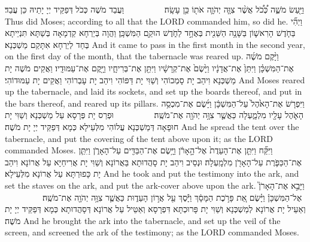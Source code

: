 {%
{וַיַּ֖עַשׂ מֹשֶׁ֑ה כְּ֠כֹ֠ל אֲשֶׁ֨ר צִוָּ֧ה יְהֹוָ֛ה אֹת֖וֹ כֵּ֥ן עָשָֽׂה׃ \setuma         }
{וַעֲבַד מֹשֶׁה כְּכֹל דְּפַקֵּיד יְיָ יָתֵיהּ כֵּן עֲבַד׃}
{Thus did Moses; according to all that the LORD commanded him, so did he.}{}
{וַיְהִ֞י בַּחֹ֧דֶשׁ הָרִאשׁ֛וֹן בַּשָּׁנָ֥ה הַשֵּׁנִ֖ית בְּאֶחָ֣ד לַחֹ֑דֶשׁ הוּקַ֖ם הַמִּשְׁכָּֽן׃}
{וַהֲוָה בְּיַרְחָא קַדְמָאָה בְּשַׁתָּא תִּנְיֵיתָא בְּחַד לְיַרְחָא אִתָּקַם מַשְׁכְּנָא׃}
{And it came to pass in the first month in the second year, on the first day of the month, that the tabernacle was reared up.}{}
{וַיָּ֨קֶם מֹשֶׁ֜ה אֶת־הַמִּשְׁכָּ֗ן וַיִּתֵּן֙ אֶת־אֲדָנָ֔יו וַיָּ֙שֶׂם֙ אֶת־קְרָשָׁ֔יו וַיִּתֵּ֖ן אֶת־בְּרִיחָ֑יו וַיָּ֖קֶם אֶת־עַמּוּדָֽיו׃}
{וַאֲקֵים מֹשֶׁה יָת מַשְׁכְּנָא וִיהַב יָת סָמְכוֹהִי וְשַׁוִּי יָת דַּפּוֹהִי וִיהַב יָת עָבְרוֹהִי וַאֲקֵים יָת עַמּוּדוֹהִי׃}
{And Moses reared up the tabernacle, and laid its sockets, and set up the boards thereof, and put in the bars thereof, and reared up its pillars.}{}
{וַיִּפְרֹ֤שׂ אֶת־הָאֹ֙הֶל֙ עַל־הַמִּשְׁכָּ֔ן וַיָּ֜שֶׂם אֶת־מִכְסֵ֥ה הָאֹ֛הֶל עָלָ֖יו מִלְמָ֑עְלָה כַּאֲשֶׁ֛ר צִוָּ֥ה יְהֹוָ֖ה אֶת־מֹשֶֽׁה׃ \setuma         
}
{וּפְרַס יָת פְּרָסָא עַל מַשְׁכְּנָא וְשַׁוִּי יָת חוּפָאָה דְּמַשְׁכְּנָא עֲלוֹהִי מִלְּעֵילָא כְּמָא דְּפַקֵּיד יְיָ יָת מֹשֶׁה׃}
{And he spread the tent over the tabernacle, and put the covering of the tent above upon it; as the LORD commanded Moses.}{}
{וַיִּקַּ֞ח וַיִּתֵּ֤ן אֶת־הָעֵדֻת֙ אֶל־הָ֣אָרֹ֔ן וַיָּ֥שֶׂם אֶת־הַבַּדִּ֖ים עַל־הָאָרֹ֑ן וַיִּתֵּ֧ן אֶת־הַכַּפֹּ֛רֶת עַל־הָאָרֹ֖ן מִלְמָֽעְלָה׃
}
{וּנְסֵיב וִיהַב יָת סָהֲדוּתָא בַּאֲרוֹנָא וְשַׁוִּי יָת אֲרִיחַיָּא עַל אֲרוֹנָא וִיהַב יָת כָּפוּרְתָּא עַל אֲרוֹנָא מִלְּעֵילָא׃}
{And he took and put the testimony into the ark, and set the staves on the ark, and put the ark-cover above upon the ark.}{}
{וַיָּבֵ֣א אֶת־הָאָרֹן֮ אֶל־הַמִּשְׁכָּן֒ וַיָּ֗שֶׂם אֵ֚ת פָּרֹ֣כֶת הַמָּסָ֔ךְ וַיָּ֕סֶךְ עַ֖ל אֲר֣וֹן הָעֵד֑וּת כַּאֲשֶׁ֛ר צִוָּ֥ה יְהֹוָ֖ה אֶת־מֹשֶֽׁה׃ \setuma         }
{וְאַעֵיל יָת אֲרוֹנָא לְמַשְׁכְּנָא וְשַׁוִּי יָת פָּרוּכְתָּא דִּפְרָסָא וְאַטֵּיל עַל אֲרוֹנָא דְּסָהֲדוּתָא כְּמָא דְּפַקֵּיד יְיָ יָת מֹשֶׁה׃}
{And he brought the ark into the tabernacle, and set up the veil of the screen, and screened the ark of the testimony; as the LORD commanded Moses.}{}
}
